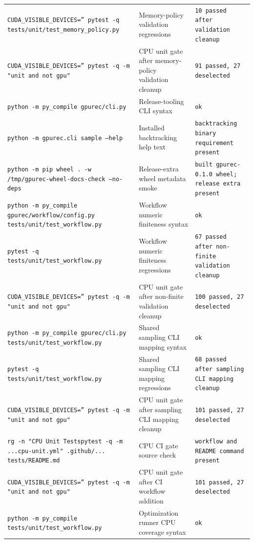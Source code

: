 \documentclass[11pt]{article}
\begin{document}
\begin{center}
\begin{tabular}{lll}
\texttt{CUDA\_VISIBLE\_DEVICES='' pytest -q tests/unit/test\_memory\_policy.py} &
Memory-policy validation regressions &
\texttt{10 passed after validation cleanup} \\
\texttt{CUDA\_VISIBLE\_DEVICES='' pytest -q -m "unit and not gpu"} &
CPU unit gate after memory-policy validation cleanup &
\texttt{91 passed, 27 deselected} \\
\texttt{python -m py\_compile gpurec/cli.py} &
Release-tooling CLI syntax &
\texttt{ok} \\
\texttt{python -m gpurec.cli sample --help} &
Installed backtracking help text &
\texttt{backtracking binary requirement present} \\
\texttt{python -m pip wheel . -w /tmp/gpurec-wheel-docs-check --no-deps} &
Release-extra wheel metadata smoke &
\texttt{built gpurec-0.1.0 wheel; release extra present} \\
\texttt{python -m py\_compile gpurec/workflow/config.py tests/unit/test\_workflow.py} &
Workflow numeric finiteness syntax &
\texttt{ok} \\
\texttt{pytest -q tests/unit/test\_workflow.py} &
Workflow numeric finiteness regressions &
\texttt{67 passed after non-finite validation cleanup} \\
\texttt{CUDA\_VISIBLE\_DEVICES='' pytest -q -m "unit and not gpu"} &
CPU unit gate after non-finite validation cleanup &
\texttt{100 passed, 27 deselected} \\
\texttt{python -m py\_compile gpurec/cli.py tests/unit/test\_workflow.py} &
Shared sampling CLI mapping syntax &
\texttt{ok} \\
\texttt{pytest -q tests/unit/test\_workflow.py} &
Shared sampling CLI mapping regressions &
\texttt{68 passed after sampling CLI mapping cleanup} \\
\texttt{CUDA\_VISIBLE\_DEVICES='' pytest -q -m "unit and not gpu"} &
CPU unit gate after sampling CLI mapping cleanup &
\texttt{101 passed, 27 deselected} \\
\texttt{rg -n "CPU Unit Tests\textbar{}pytest -q -m ...\textbar{}cpu-unit.yml" .github/... tests/README.md} &
CPU CI gate source check &
\texttt{workflow and README command present} \\
\texttt{CUDA\_VISIBLE\_DEVICES='' pytest -q -m "unit and not gpu"} &
CPU unit gate after CI workflow addition &
\texttt{101 passed, 27 deselected} \\
\texttt{python -m py\_compile tests/unit/test\_workflow.py} &
Optimization runner CPU coverage syntax &
\texttt{ok} \\

\end{tabular}
\end{center}
\end{document}
